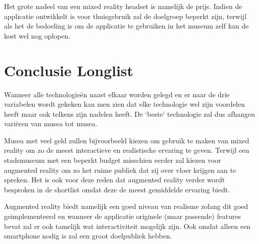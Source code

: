 Het grote nadeel van een mixed reality headset is namelijk de prijs. Indien de applicatie ontwikkelt is voor thuisgebruik zal de doelgroep beperkt zijn, terwijl als het de bedoeling is om de applicatie te gebruiken in het museum zelf kan de kost wel nog oplopen.


\section{Conclusie Longlist}
Wanneer alle technologieën naast elkaar worden gelegd en er naar de drie variabelen wordt gekeken kan men zien dat elke technologie wel zijn voordelen heeft maar ook telkens zijn nadelen heeft. De `beste` technologie zal dus afhangen variëren van musea tot musea. 

Musea met veel geld zullen bijvoorbeeld kiezen om gebruik te maken van mixed reality om zo de meest interactieve en realistische ervaring te geven. Terwijl een stadsmuseum met een beperkt budget misschien eerder zal kiezen voor augmented reality om zo het ruime publiek dat zij over vloer krijgen aan te spreken. Het is ook voor deze reden dat augmented reality verder wordt besproken in de shortlist omdat deze de meest gemiddelde ervaring biedt.

Augmented reality biedt namelijk een goed niveau van realisme zolang dit goed geimplementeerd en wanneer de applicatie originele (maar passende) features bevat zal er ook tamelijk wat interactiviteit mogelijk zijn. Ook omdat alleen een smartphone nodig is zal een groot doelpubliek hebben.
